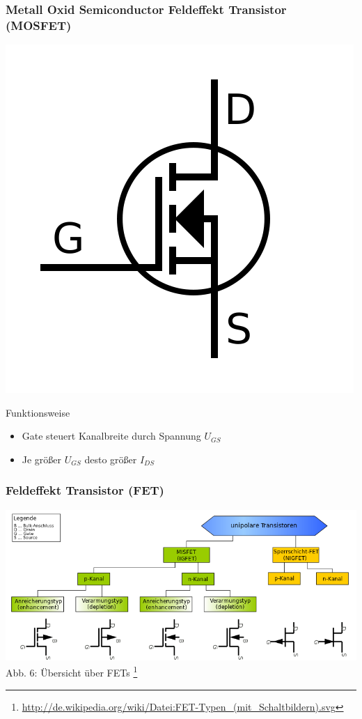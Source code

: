 \begin{frame}
\frametitle{Metall Oxid Semiconductor Feldeffekt Transistor (MOSFET)}
\begin{center}
	\includegraphics[scale=0.2]{e13/N-Ch_Enh_Labelled.png}\\
\begin{block}{Funktionsweise}
\begin{itemize}
	\item Gate steuert Kanalbreite durch Spannung $U_{GS}$
	\item Je größer $U_{GS}$ desto größer $I_{DS}$
\end{itemize}
\end{block}
\end{center}
\end{frame}

\begin{frame}
\frametitle{Feldeffekt Transistor (FET)}
\begin{center}
	\includegraphics[scale=0.35]{e13/FET-overview.png}\\
	Abb. 6: Übersicht über FETs
	\footnote{\url{http://de.wikipedia.org/wiki/Datei:FET-Typen_(mit_Schaltbildern).svg}}\\
\end{center}
\end{frame}

